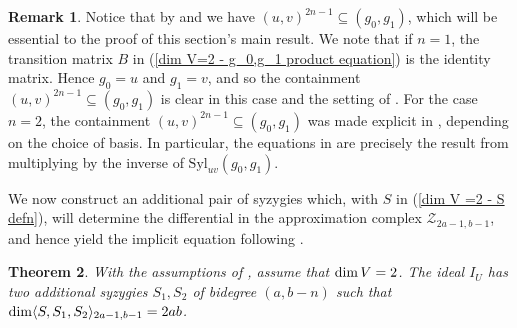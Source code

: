 \documentclass[reqno]{amsart}
\newtheorem{thm}{Theorem}[section]
\numberwithin{equation}{section}
\theoremstyle{definition}
\newtheorem{rem}[thm]{Remark}
\def\Z{\mathcal{Z}}
\def\dim{\mathop{\rm dim}}
\def\Syl{\mathrm{Syl}}
\begin{document}
\begin{rem}\label{power max ideal in (g0,g1)}
Notice that by  and  we have $(u,v)^{2n-1}\subseteq (g_0,g_1)$, which will be essential to the proof of this section's main result. We note that if $n=1$, the transition matrix $B$ in (\ref{dim V=2 - g_0,g_1 product equation}) is the identity matrix.  Hence $g_0 =u$ and $g_1=v$, and so the containment $(u,v)^{2n-1}\subseteq (g_0,g_1)$ is clear in this case and the setting of \cite{DS16}. For the case $n=2$, the containment $(u,v)^{2n-1}\subseteq (g_0,g_1)$ was made explicit in \cite{Weaver25}, depending on the choice of basis. In particular, the equations in \cite[4.1]{Weaver25} are precisely the result from multiplying by the inverse of $\Syl_{uv}(g_0,g_1)$.
\end{rem}



We now construct an additional pair of syzygies which, with $S$ in (\ref{dim V =2 - S defn}), will determine the differential in the approximation complex $\Z_{2a-1,b-1}$, and hence yield the implicit equation following .



\begin{thm}\label{dim V = 2 - main theorem}
With the assumptions of , assume that $\dim V =2$. The ideal $I_U$ has two additional syzygies $S_1, S_2$ of bidegree $(a,b-n)$ such that $\dim \langle S,S_1,S_2\rangle_{2a-1,b-1}=2ab$. 
\end{thm}
\end{document}
